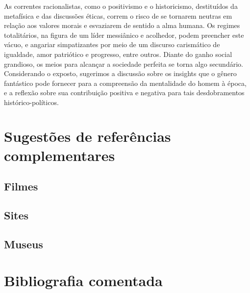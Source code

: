 \documentclass[11pt]{extarticle}
\begin{document}
As correntes racionalistas, como o positivismo e o historicismo,
destituídos da metafísica e das discussões éticas, correm o risco de
se tornarem neutras em relação aos valores morais e esvaziarem de
sentido a alma humana. Os regimes totalitários, na figura de um líder
messiânico e acolhedor, podem preencher este vácuo, e angariar
simpatizantes por meio de um discurso carismático de igualdade, amor
patriótico e progresso, entre outros. Diante do ganho social
grandioso, os meios para alcançar a sociedade perfeita se torna algo
secundário. Considerando o exposto, sugerimos a discussão sobre os
insights que o gênero fantástico pode fornecer para a compreensão da
mentalidade do homem à época, e a reflexão sobre sua contribuição
positiva e negativa para tais desdobramentos histórico-políticos.

\section{Sugestões de referências complementares}\label{sugestoes}

\subsection{Filmes}
\subsection{Sites}
\subsection{Museus}

\section{Bibliografia comentada}
\end{document}
